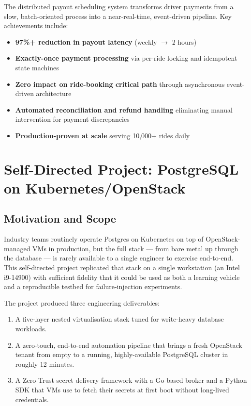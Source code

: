 \documentclass[12pt,a4paper,oneside]{report}
\begin{document}
The distributed payout scheduling system transforms driver payments from a slow, batch-oriented process into a near-real-time, event-driven pipeline. Key achievements include:

\begin{itemize}
    \item \textbf{97\%+ reduction in payout latency} (weekly $\to$ 2 hours)
    \item \textbf{Exactly-once payment processing} via per-ride locking and idempotent state machines
    \item \textbf{Zero impact on ride-booking critical path} through asynchronous event-driven architecture
    \item \textbf{Automated reconciliation and refund handling} eliminating manual intervention for payment discrepancies
    \item \textbf{Production-proven at scale} serving 10,000+ rides daily
\end{itemize}



\chapter[PostgreSQL on Kubernetes/OpenStack]{Self-Directed Project: PostgreSQL on Kubernetes/OpenStack}
\label{chap:postgres-k8s}

\section{Motivation and Scope}

Industry teams routinely operate Postgres on Kubernetes on top of OpenStack-managed VMs in production, but the full stack --- from bare metal up through the database --- is rarely available to a single engineer to exercise end-to-end. This self-directed project replicated that stack on a single workstation (an Intel i9-14900) with sufficient fidelity that it could be used as both a learning vehicle and a reproducible testbed for failure-injection experiments.

The project produced three engineering deliverables:

\begin{enumerate}[leftmargin=*]
    \item A five-layer nested virtualisation stack tuned for write-heavy database workloads.
    \item A zero-touch, end-to-end automation pipeline that brings a fresh OpenStack tenant from empty to a running, highly-available PostgreSQL cluster in roughly 12 minutes.
    \item A Zero-Trust secret delivery framework with a Go-based broker and a Python SDK that VMs use to fetch their secrets at first boot without long-lived credentials.
\end{enumerate}
\end{document}
